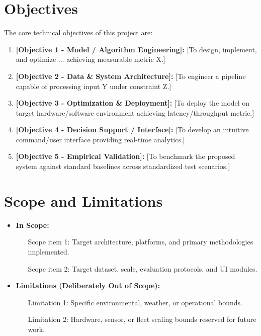\section{Objectives}
The core technical objectives of this project are:
\begin{enumerate}
    \item \textbf{[Objective 1 - Model / Algorithm Engineering]:} [To design, implement, and optimize ... achieving measurable metric X.]
    \item \textbf{[Objective 2 - Data \& System Architecture]:} [To engineer a pipeline capable of processing input Y under constraint Z.]
    \item \textbf{[Objective 3 - Optimization \& Deployment]:} [To deploy the model on target hardware/software environment achieving latency/throughput metric.]
    \item \textbf{[Objective 4 - Decision Support / Interface]:} [To develop an intuitive command/user interface providing real-time analytics.]
    \item \textbf{[Objective 5 - Empirical Validation]:} [To benchmark the proposed system against standard baselines across standardized test scenarios.]
\end{enumerate}

\section{Scope and Limitations}
\begin{itemize}
    \item \textbf{In Scope:}
    \begin{itemize}
        \item [Scope item 1: Target architecture, platforms, and primary methodologies implemented.]
        \item [Scope item 2: Target dataset, scale, evaluation protocols, and UI modules.]
    \end{itemize}
    \item \textbf{Limitations (Deliberately Out of Scope):}
    \begin{itemize}
        \item [Limitation 1: Specific environmental, weather, or operational bounds.]
        \item [Limitation 2: Hardware, sensor, or fleet scaling bounds reserved for future work.]
    \end{itemize}
\end{itemize}

